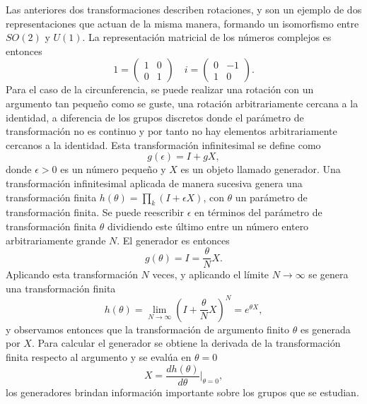 Las anteriores dos transformaciones describen rotaciones, y son un ejemplo de dos representaciones que actuan de la misma manera, formando un isomorfismo entre $SO(2)$ y $U(1)$. La representación matricial de los números complejos es entonces
\begin{equation*}
  1 = \begin{pmatrix}
    1 & 0 \\ 0 & 1
  \end{pmatrix} \quad i = \begin{pmatrix}
    0 & -1 \\ 1 & 0
  \end{pmatrix}.
\end{equation*}
Para el caso de la circunferencia, se puede realizar una rotación con un argumento tan pequeño como se guste, una rotación arbitrariamente cercana a la identidad, a diferencia de los grupos discretos  donde el parámetro de transformación no es continuo y por tanto no hay elementos arbitrariamente cercanos a la identidad. Esta transformación infinitesimal se define como
\begin{equation*}
  g(\epsilon) = I + gX,
\end{equation*}
donde $\epsilon>0$ es un número pequeño y $X$ es un objeto llamado generador. Una transformación infinitesimal aplicada de manera sucesiva genera una transformación finita $h(\theta) = \prod_k (I+\epsilon X)$, con $\theta$ un parámetro de transformación finita. Se puede reescribir $\epsilon$ en términos del parámetro de transformación finita $\theta$ dividiendo este último entre un número entero arbitrariamente grande $N$. El generador es entonces
\begin{equation*}
  g(\theta) = I = \frac{\theta}{N} X.
\end{equation*}
Aplicando esta transformación $N$ veces, y aplicando el límite $N\to\infty$ se genera una transformación finita
\begin{equation*}
  h(\theta) = \lim_{N\to\infty}\left( I + \frac{\theta}{N}X \right)^N = e^{\theta X},
\end{equation*}
y observamos entonces que la transformación de argumento finito $\theta$ es generada por $X$. Para calcular el generador se obtiene la derivada de la transformación finita respecto al argumento y se evalúa en $\theta=0$
\begin{equation}\label{eq:generator}
  X = \frac{dh(\theta)}{d\theta} \bigg|_{\theta=0},
\end{equation}
los generadores brindan información importante sobre los grupos que se estudian.
